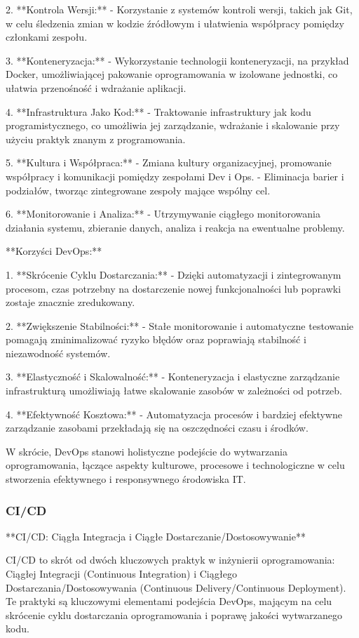 2. **Kontrola Wersji:**
   - Korzystanie z systemów kontroli wersji, takich jak Git, w celu śledzenia zmian w kodzie źródłowym i ułatwienia współpracy pomiędzy członkami zespołu.

3. **Konteneryzacja:**
   - Wykorzystanie technologii konteneryzacji, na przykład Docker, umożliwiającej pakowanie oprogramowania w izolowane jednostki, co ułatwia przenośność i wdrażanie aplikacji.

4. **Infrastruktura Jako Kod:**
   - Traktowanie infrastruktury jak kodu programistycznego, co umożliwia jej zarządzanie, wdrażanie i skalowanie przy użyciu praktyk znanym z programowania.

5. **Kultura i Współpraca:**
   - Zmiana kultury organizacyjnej, promowanie współpracy i komunikacji pomiędzy zespołami Dev i Ops.
   - Eliminacja barier i podziałów, tworząc zintegrowane zespoły mające wspólny cel.

6. **Monitorowanie i Analiza:**
   - Utrzymywanie ciągłego monitorowania działania systemu, zbieranie danych, analiza i reakcja na ewentualne problemy.

**Korzyści DevOps:**

1. **Skrócenie Cyklu Dostarczania:**
   - Dzięki automatyzacji i zintegrowanym procesom, czas potrzebny na dostarczenie nowej funkcjonalności lub poprawki zostaje znacznie zredukowany.

2. **Zwiększenie Stabilności:**
   - Stałe monitorowanie i automatyczne testowanie pomagają zminimalizować ryzyko błędów oraz poprawiają stabilność i niezawodność systemów.

3. **Elastyczność i Skalowalność:**
   - Konteneryzacja i elastyczne zarządzanie infrastrukturą umożliwiają łatwe skalowanie zasobów w zależności od potrzeb.

4. **Efektywność Kosztowa:**
   - Automatyzacja procesów i bardziej efektywne zarządzanie zasobami przekładają się na oszczędności czasu i środków.

W skrócie, DevOps stanowi holistyczne podejście do wytwarzania oprogramowania, łączące aspekty kulturowe, procesowe i technologiczne w celu stworzenia efektywnego i responsywnego środowiska IT.
\subsubsection{CI/CD}
**CI/CD: Ciągła Integracja i Ciągłe Dostarczanie/Dostosowywanie**

CI/CD to skrót od dwóch kluczowych praktyk w inżynierii oprogramowania: Ciągłej Integracji (Continuous Integration) i Ciągłego Dostarczania/Dostosowywania (Continuous Delivery/Continuous Deployment). Te praktyki są kluczowymi elementami podejścia DevOps, mającym na celu skrócenie cyklu dostarczania oprogramowania i poprawę jakości wytwarzanego kodu.

